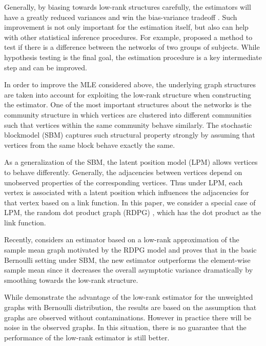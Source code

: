 \documentclass[a4paper]{article}
\begin{document}
Generally, by biasing towards low-rank structures carefully, the estimators will have a greatly reduced variances and win the bias-variance tradeoff \citep{trunk1979problem}. Such improvement is not only important for the estimation itself, but also can help with other statistical inference procedures. For example, \citet{ginestet2014hypothesis} proposed a method to test if there is a difference between the networks of two groups of subjects. While hypothesis testing is the final goal, the estimation procedure is a key intermediate step and can be improved.

In order to improve the MLE considered above, the underlying graph structures are taken into account for exploiting the low-rank structure when constructing the estimator. One of the most important structures about the networks is the community structure in which vertices are clustered into different communities such that vertices within the same community behave similarly. The stochastic blockmodel (SBM) \citep{holland1983stochastic} captures such structural property strongly by assuming that vertices from the same block behave exactly the same.

As a generalization of the SBM, the latent position model (LPM) \citep{hoff2002latent} allows vertices to behave differently. Generally, the adjacencies between vertices depend on unobserved properties of the corresponding vertices. Thus under LPM, each vertex is associated with a latent position which influences the adjacencies for that vertex based on a link function. In this paper, we consider a special case of LPM, the random dot product graph (RDPG) \citep{young2007random, nickel2007random}, which has the dot product as the link function.

Recently, \citet{tang2016law} considers an estimator based on a low-rank approximation of the sample mean graph motivated by the RDPG model and proves that in the basic Bernoulli setting under SBM, the new estimator outperforms the element-wise sample mean since it decreases the overall asymptotic variance dramatically by smoothing towards the low-rank structure.

While \citet{tang2016law} demonstrate the advantage of the low-rank estimator for the unweighted graphs with Bernoulli distribution, the results are based on the assumption that graphs are observed without contaminations. However in practice there will be noise in the observed graphs. In this situation, there is no guarantee that the performance of the low-rank estimator is still better.
\end{document}

